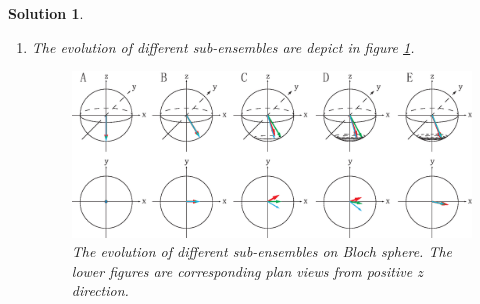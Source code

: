 \documentclass[UTF8,10pt,a4paper]{article}
\theoremstyle{Problem}
\theoremstyle{Solution}
\newtheorem*{sol}{Solution}
\begin{document}
\begin{sol}
    \begin{enumerate}
        \item[(a)] The evolution of different sub-ensembles are depict in figure \ref{B-S}.
        \begin{figure}[h]
            \centering
            \includegraphics[width=1.0\textwidth]{1.eps}
            \caption{The evolution of different sub-ensembles on Bloch sphere. The lower figures are corresponding plan views from positive $z$ direction.}
            \label{B-S}
        \end{figure}


\end{enumerate}
\end{sol}
\end{document}
